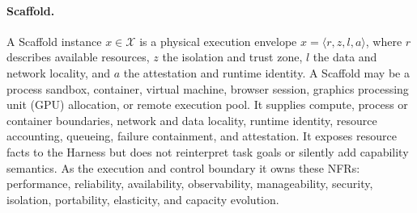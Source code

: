\documentclass[11pt]{article}
\begin{document}
\paragraph{Scaffold.}
A Scaffold instance $x\in\mathcal{X}$ is a physical execution envelope $x=\langle r,z,l,a\rangle$, where $r$ describes available resources, $z$ the isolation and trust zone, $l$ the data and network locality, and $a$ the attestation and runtime identity. A Scaffold may be a process sandbox, container, virtual machine, browser session, graphics processing unit (GPU) allocation, or remote execution pool. It supplies compute, process or container boundaries, network and data locality, runtime identity, resource accounting, queueing, failure containment, and attestation. It exposes resource facts to the Harness but does not reinterpret task goals or silently add capability semantics. As the execution and control boundary it owns these NFRs: performance, reliability, availability, observability, manageability, security, isolation, portability, elasticity, and capacity evolution.
\end{document}
